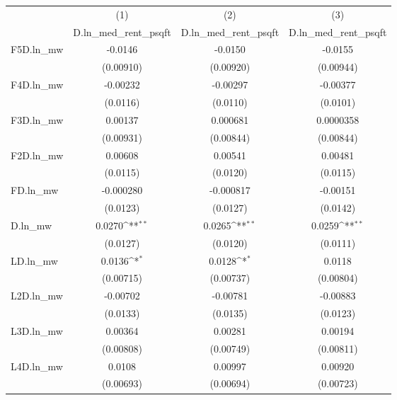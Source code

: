 {
\def\sym#1{\ifmmode^{#1}\else\(^{#1}\)\fi}
\begin{tabular}{l*{3}{c}}
\hline\hline
          &\multicolumn{1}{c}{(1)}&\multicolumn{1}{c}{(2)}&\multicolumn{1}{c}{(3)}\\
          &\multicolumn{1}{c}{D.ln\_med\_rent\_psqft}&\multicolumn{1}{c}{D.ln\_med\_rent\_psqft}&\multicolumn{1}{c}{D.ln\_med\_rent\_psqft}\\
\hline
F5D.ln\_mw &  -0.0146         &  -0.0150         &  -0.0155         \\
          &(0.00910)         &(0.00920)         &(0.00944)         \\
[1em]
F4D.ln\_mw & -0.00232         & -0.00297         & -0.00377         \\
          & (0.0116)         & (0.0110)         & (0.0101)         \\
[1em]
F3D.ln\_mw &  0.00137         & 0.000681         &0.0000358         \\
          &(0.00931)         &(0.00844)         &(0.00844)         \\
[1em]
F2D.ln\_mw &  0.00608         &  0.00541         &  0.00481         \\
          & (0.0115)         & (0.0120)         & (0.0115)         \\
[1em]
FD.ln\_mw  &-0.000280         &-0.000817         & -0.00151         \\
          & (0.0123)         & (0.0127)         & (0.0142)         \\
[1em]
D.ln\_mw   &   0.0270\sym{**} &   0.0265\sym{**} &   0.0259\sym{**} \\
          & (0.0127)         & (0.0120)         & (0.0111)         \\
[1em]
LD.ln\_mw  &   0.0136\sym{*}  &   0.0128\sym{*}  &   0.0118         \\
          &(0.00715)         &(0.00737)         &(0.00804)         \\
[1em]
L2D.ln\_mw & -0.00702         & -0.00781         & -0.00883         \\
          & (0.0133)         & (0.0135)         & (0.0123)         \\
[1em]
L3D.ln\_mw &  0.00364         &  0.00281         &  0.00194         \\
          &(0.00808)         &(0.00749)         &(0.00811)         \\
[1em]
L4D.ln\_mw &   0.0108         &  0.00997         &  0.00920         \\
          &(0.00693)         &(0.00694)         &(0.00723)         \\

\end{tabular}}
